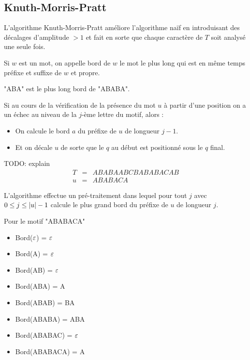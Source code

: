\subsection{Knuth-Morris-Pratt}


L'algorithme Knuth-Morris-Pratt améliore l'algorithme naïf en introduisant des décalages d'amplitude
$> 1$ et fait en sorte que chaque caractère de $T$ soit analysé une seule fois.

\iffalse
	\begin{itemize}
		\item Amélioration par rapport à l'algorithme naïf:

		      L'algorithme ne prend en considération que certains décalages
		      pour le motif en excluant les décalages où on ne pourra pas trouver le motif.
	\end{itemize}
\fi


\begin{definition}
	Si $w$ est un mot, on appelle bord de $w$ le mot le plus long qui est en même temps préfixe et suffixe de $w$ et propre.
\end{definition}

\begin{exemple}
	"ABA" est le plus long bord de "ABABA".
\end{exemple}

Si au cours de la vérification de la présence du mot $u$ à partir d'une position
on a un échec au niveau de la $j$-ème lettre du motif, alors :

\begin{itemize}
	\item On calcule le bord $a$ du préfixe de $u$ de longueur $j-1$.
	\item Et on décale $u$ de sorte que le $q$ au début est positionné sous le $q$ final.
\end{itemize}

\begin{exemple}
	TODO: explain
	\begin{eqnarray*}
		T &=&  ABABAABCBABABACAB \\
		u &=& ABABACA
	\end{eqnarray*}
\end{exemple}


L'algorithme effectue un pré-traitement dans lequel pour tout $j$ avec $0 \leq j \leq |u| - 1$
calcule le plus grand bord du préfixe de $u$ de longueur $j$.

\begin{exemple}
	Pour le motif "ABABACA"
	\begin{itemize}
		\item Bord($\varepsilon$) = $\varepsilon$
		\item Bord(A) = $\varepsilon$
		\item Bord(AB) = $\varepsilon$
		\item Bord(ABA) = A
		\item Bord(ABAB) = BA
		\item Bord(ABABA) = ABA
		\item Bord(ABABAC) = $\varepsilon$
		\item Bord(ABABACA) = A
	\end{itemize}
\end{exemple}

